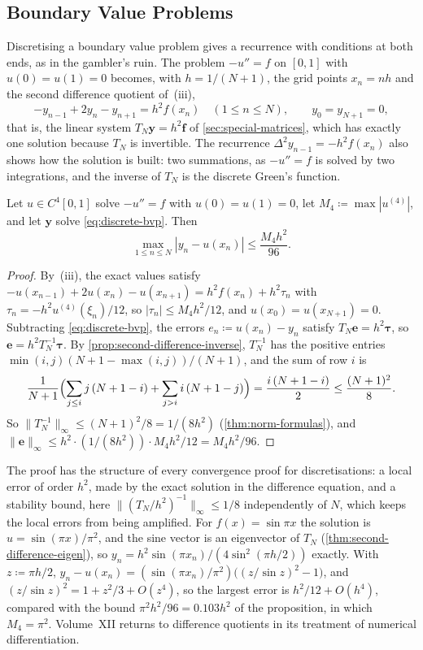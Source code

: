 \subsection{Boundary Value Problems}

Discretising a boundary value problem gives a recurrence with conditions at both ends, as in the gambler's ruin. The problem $-u''=f$ on $[0,1]$ with $u(0)=u(1)=0$ becomes, with $h=1/(N+1)$, the grid points $x_n=nh$ and the second difference quotient of \,(iii),
\begin{equation}
-y_{n-1}+2y_n-y_{n+1}=h^2f(x_n)\quad(1\le n\le N),\qquad y_0=y_{N+1}=0 ,
\label{eq:discrete-bvp}
\end{equation}
that is, the linear system $T_N\mathbf y=h^2\mathbf f$ of \cref{sec:special-matrices}, which has exactly one solution because $T_N$ is invertible. The recurrence $\Delta^2y_{n-1}=-h^2f(x_n)$ also shows how the solution is built: two summations, as $-u''=f$ is solved by two integrations, and the inverse of $T_N$ is the discrete Green's function.

\begin{proposition}
\label{prop:discrete-bvp}
Let $u\in C^4[0,1]$ solve $-u''=f$ with $u(0)=u(1)=0$, let $M_4\coloneqq\max|u^{(4)}|$, and let $\mathbf y$ solve \eqref{eq:discrete-bvp}. Then
\[
\max_{1\le n\le N}|y_n-u(x_n)|\le\frac{M_4h^2}{96} .
\]
\end{proposition}

\begin{proof}
By \,(iii), the exact values satisfy $-u(x_{n-1})+2u(x_n)-u(x_{n+1})=h^2f(x_n)+h^2\tau_n$ with $\tau_n=-h^2u^{(4)}(\xi_n)/12$, so $|\tau_n|\le M_4h^2/12$, and $u(x_0)=u(x_{N+1})=0$. Subtracting \eqref{eq:discrete-bvp}, the errors $e_n\coloneqq u(x_n)-y_n$ satisfy $T_N\mathbf e=h^2\boldsymbol\tau$, so $\mathbf e=h^2T_N^{-1}\boldsymbol\tau$. By \cref{prop:second-difference-inverse}, $T_N^{-1}$ has the positive entries $\min(i,j)(N+1-\max(i,j))/(N+1)$, and the sum of row $i$ is
\[
\frac{1}{N+1}\Bigl(\sum_{j\le i}j\,(N+1-i)+\sum_{j>i}i\,(N+1-j)\Bigr)=\frac{i\,(N+1-i)}2\le\frac{(N+1)^2}8 .
\]
So $\|T_N^{-1}\|_\infty\le(N+1)^2/8=1/(8h^2)$ (\cref{thm:norm-formulas}), and $\|\mathbf e\|_\infty\le h^2\cdot(1/(8h^2))\cdot M_4h^2/12=M_4h^2/96$.
\end{proof}

The proof has the structure of every convergence proof for discretisations: a local error of order $h^2$, made by the exact solution in the difference equation, and a stability bound, here $\|(T_N/h^2)^{-1}\|_\infty\le1/8$ independently of $N$, which keeps the local errors from being amplified. For $f(x)=\sin\pi x$ the solution is $u=\sin(\pi x)/\pi^2$, and the sine vector is an eigenvector of $T_N$ (\cref{thm:second-difference-eigen}), so $y_n=h^2\sin(\pi x_n)/(4\sin^2(\pi h/2))$ exactly. With $z\coloneqq\pi h/2$, $y_n-u(x_n)=(\sin(\pi x_n)/\pi^2)\bigl((z/\sin z)^2-1\bigr)$, and $(z/\sin z)^2=1+z^2/3+O(z^4)$, so the largest error is $h^2/12+O(h^4)$, compared with the bound $\pi^2h^2/96=0.103h^2$ of the proposition, in which $M_4=\pi^2$. Volume~XII returns to difference quotients in its treatment of numerical differentiation.

